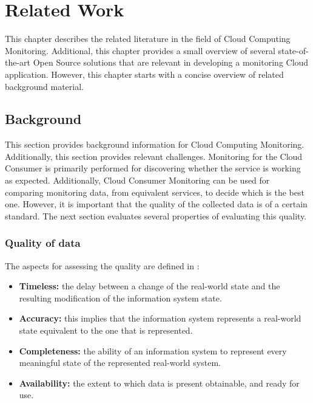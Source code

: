 \chapter{Related Work}\label{ch:related_work}
This chapter describes the related literature in the field of Cloud Computing Monitoring. Additional, this chapter provides a small overview of several state-of-the-art Open Source solutions that are relevant in developing a monitoring Cloud application. However, this chapter starts with a concise overview of related background material.

\section{Background} \label{sec:background}
This section provides background information for Cloud Computing Monitoring. Additionally, this section provides relevant challenges. Monitoring for the Cloud Consumer is primarily performed for discovering whether the service is working as expected. Additionally, Cloud Consumer Monitoring can be used for comparing monitoring data, from equivalent services, to decide which is the best one. However, it is important that the quality of the collected data is of a certain standard. The next section evaluates several properties of evaluating this quality.

\subsection{Quality of data} \label{sec:quality}
The aspects for assessing the quality are defined in \cite{wand1996anchoring}:
\begin{itemize}
    \item \textbf{Timeless: }the delay between a change of the real-world state and the resulting modification of the information system state.
    \item \textbf{Accuracy: }this implies that the information system represents a real-world state equivalent to the one that is represented.
    \item \textbf{Completeness: }the ability of an information system to represent every meaningful state of the represented real-world system.
    \item \textbf{Availability: }the extent to which data is present obtainable, and ready for use.
\end{itemize}

